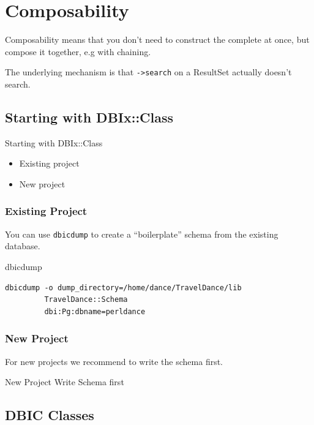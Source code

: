 \section{Composability}

Composability means that you don't need to construct the
complete at once, but compose it together, e.g with
chaining.

The underlying mechanism is that \verb|->search| on a
ResultSet actually doesn't search.


\subsection{Starting with DBIx::Class}

\begin{frame}{Starting with DBIx::Class}
\begin{itemize}
\item Existing project
\item New project
\end{itemize}
\end{frame}

\subsubsection{Existing Project}

You can use \verb|dbicdump| to create a ``boilerplate'' schema from the
existing database.

\begin{frame}[fragile]{dbicdump}
\begin{lstlisting}
dbicdump -o dump_directory=/home/dance/TravelDance/lib 
         TravelDance::Schema 
         dbi:Pg:dbname=perldance
\end{lstlisting}
\end{frame}

\subsubsection{New Project}

For new projects we recommend to write the schema first.

\begin{frame}[fragile]{New Project}
Write Schema first
\end{frame}


\subsection{DBIC Classes}

